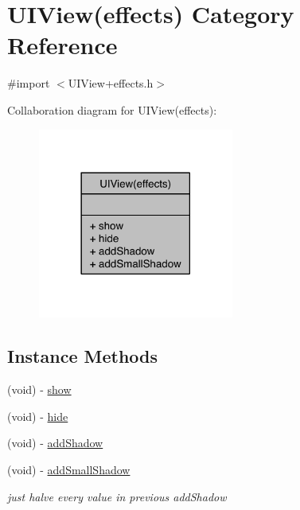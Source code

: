 \hypertarget{category_u_i_view_07effects_08}{\section{U\-I\-View(effects) Category Reference}
\label{category_u_i_view_07effects_08}
}


{\ttfamily \#import $<$U\-I\-View+effects.\-h$>$}



Collaboration diagram for U\-I\-View(effects)\-:
\nopagebreak
\begin{figure}[H]
\begin{center}
\leavevmode
\includegraphics[width=182pt]{category_u_i_view_07effects_08__coll__graph}
\end{center}
\end{figure}
\subsection*{Instance Methods}
\begin{DoxyCompactItemize}
\item 
(void) -\/ \hyperlink{category_u_i_view_07effects_08_a37db18b64f2fce7338f89daea3ac7d0f}{show}
\item 
(void) -\/ \hyperlink{category_u_i_view_07effects_08_a6a5cd93f14e1f5e1bdb84088f9b0c6a9}{hide}
\item 
(void) -\/ \hyperlink{category_u_i_view_07effects_08_ab71cfe88b27438bb0bc6eb639e5d8c4e}{add\-Shadow}
\item 
(void) -\/ \hyperlink{category_u_i_view_07effects_08_a95b2e7800dc6265b78ff67a5af78e7e8}{add\-Small\-Shadow}
\begin{DoxyCompactList}\small\item\em just halve every value in previous add\-Shadow \end{DoxyCompactList}\end{DoxyCompactItemize}


